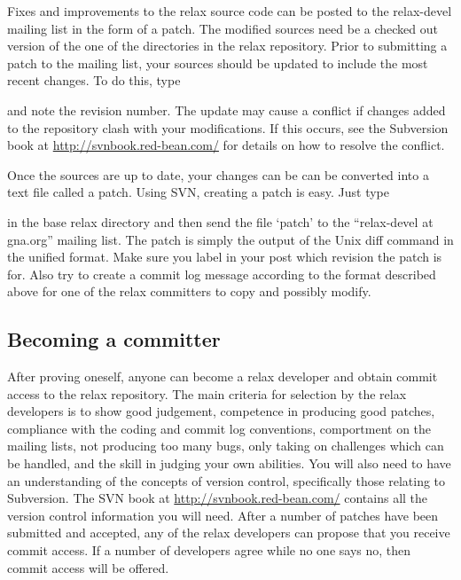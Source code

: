 Fixes and improvements to the relax source code can be posted to the relax-devel mailing list in the form of a patch.  The modified sources need be a checked out version of the one of the directories in the relax repository.  Prior to submitting a patch to the mailing list, your sources should be updated to include the most recent changes.  To do this, type


and note the revision number.  The update may cause a conflict if changes added to the repository clash with your modifications.  If this occurs, see the Subversion book at \href{http://svnbook.red-bean.com/}{http://svnbook.red-bean.com/} for details on how to resolve the conflict.

Once the sources are up to date, your changes can be can be converted into a text file called a patch.  Using SVN, creating a patch is easy.  Just type


in the base relax directory and then send the file `patch' to the ``relax-devel at gna.org'' mailing list.  The patch is simply the output of the Unix diff command in the unified format.  Make sure you label in your post which revision the patch is for.  Also try to create a commit log message according to the format described above for one of the relax committers to copy and possibly modify.


\subsection{Becoming a committer}

After proving oneself, anyone can become a relax developer and obtain commit access to the relax repository.  The main criteria for selection by the relax developers is to show good judgement, competence in producing good patches, compliance with the coding and commit log conventions, comportment on the mailing lists, not producing too many bugs, only taking on challenges which can be handled, and the skill in judging your own abilities.  You will also need to have an understanding of the concepts of version control, specifically those relating to Subversion.  The SVN book at \href{http://svnbook.red-bean.com/}{http://svnbook.red-bean.com/} contains all the version control information you will need.  After a number of patches have been submitted and accepted, any of the relax developers can propose that you receive commit access.  If a number of developers agree while no one says no, then commit access will be offered.

